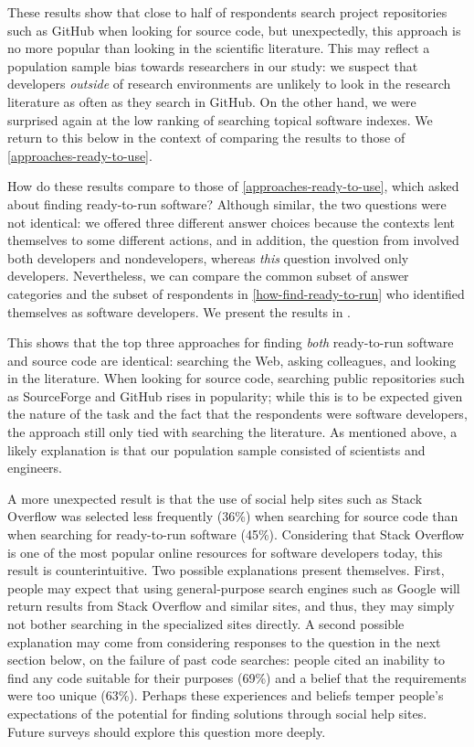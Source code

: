 \documentclass{casicswhitepaper}
\begin{document}
These results show that close to half of respondents search project repositories such as GitHub when looking for source code, but unexpectedly, this approach is no more popular than looking in the scientific literature.  This may reflect a population sample bias towards researchers in our study: we suspect that developers \emph{outside} of research environments are unlikely to look in the research literature as often as they search in GitHub.  On the other hand, we were surprised again at the low ranking of searching topical software indexes.  We return to this below in the context of comparing the results to those of \ref{approaches-ready-to-use}.

How do these results compare to those of \ref{approaches-ready-to-use}, which asked about finding ready-to-run software?  Although similar, the two questions were not identical: we offered three different answer choices because the contexts lent themselves to some different actions, and in addition, the question from  involved both developers and nondevelopers, whereas \emph{this} question involved only developers.  Nevertheless, we can compare the common subset of answer categories and the subset of respondents in \ref{how-find-ready-to-run} who identified themselves as software developers.  We present the results in .

This shows that the top three approaches for finding \emph{both} ready-to-run software and source code are identical: searching the Web, asking colleagues, and looking in the literature.  When looking for source code, searching public repositories such as SourceForge and GitHub rises in popularity; while this is to be expected given the nature of the task and the fact that the respondents were software developers, the approach still only tied with searching the literature.  As mentioned above, a likely explanation is that our population sample consisted of scientists and engineers.

A more unexpected result is that the use of social help sites such as Stack Overflow was selected less frequently (36\%) when searching for source code than when searching for ready-to-run software (45\%).  Considering that Stack Overflow is one of the most popular online resources for software developers today, this result is counterintuitive.  Two possible explanations present themselves.  First, people may expect that using general-purpose search engines such as Google will return results from Stack Overflow and similar sites, and thus, they may simply not bother searching in the specialized sites directly.  A second possible explanation may come from considering responses to the question in the next section below, on the failure of past code searches: people cited an inability to find any code suitable for their purposes (69\%) and a belief that the requirements were too unique (63\%).  Perhaps these experiences and beliefs temper people's expectations of the potential for finding solutions through social help sites.  Future surveys should explore this question more deeply.
\end{document}
